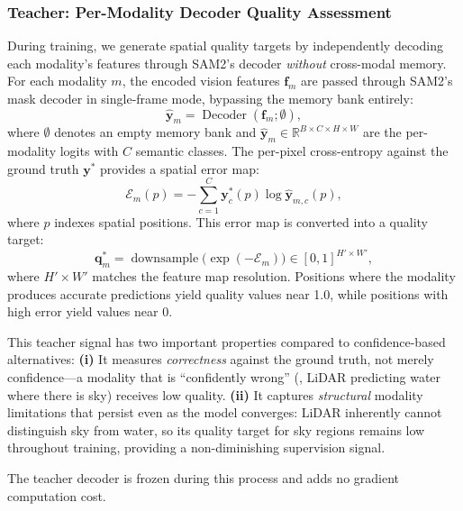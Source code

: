 \subsubsection{Teacher: Per-Modality Decoder Quality Assessment}
\label{sec:teacher}

During training, we generate spatial quality targets by independently decoding each modality's features through SAM2's decoder \emph{without} cross-modal memory.
For each modality $m$, the encoded vision features $\mathbf{f}_m$ are passed through SAM2's mask decoder in single-frame mode, bypassing the memory bank entirely:
\begin{equation}
  \hat{\mathbf{y}}_m = \operatorname{Decoder}(\mathbf{f}_m; \emptyset),
  \label{eq:teacher_decode}
\end{equation}
where $\emptyset$ denotes an empty memory bank and $\hat{\mathbf{y}}_m \in \mathbb{R}^{B \times C \times H \times W}$ are the per-modality logits with $C$ semantic classes.
The per-pixel cross-entropy against the ground truth $\mathbf{y}^*$ provides a spatial error map:
\begin{equation}
  \mathcal{E}_m(p) = -\sum_{c=1}^{C} \mathbf{y}^*_c(p) \log \hat{\mathbf{y}}_{m,c}(p),
  \label{eq:ce_map}
\end{equation}
where $p$ indexes spatial positions.
This error map is converted into a quality target:
\begin{equation}
  \mathbf{q}^*_m = \operatorname{downsample}\bigl(\exp(-\mathcal{E}_m)\bigr) \in [0, 1]^{H' \times W'},
  \label{eq:quality_target}
\end{equation}
where $H' \times W'$ matches the feature map resolution.
Positions where the modality produces accurate predictions yield quality values near 1.0, while positions with high error yield values near 0.

This teacher signal has two important properties compared to confidence-based alternatives:
\textbf{(i)} It measures \emph{correctness} against the ground truth, not merely confidence---a modality that is ``confidently wrong'' (\eg, LiDAR predicting water where there is sky) receives low quality.
\textbf{(ii)} It captures \emph{structural} modality limitations that persist even as the model converges: LiDAR inherently cannot distinguish sky from water, so its quality target for sky regions remains low throughout training, providing a non-diminishing supervision signal.

The teacher decoder is frozen during this process and adds no gradient computation cost.

